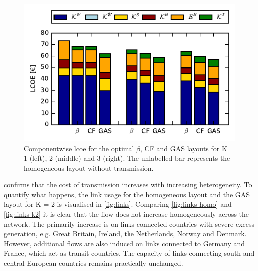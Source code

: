 \documentclass[a4paper, 5p, sort&compress]{elsarticle}%
\begin{document}
\begin{figure}[h!]
  \centering
  \includegraphics[width = \columnwidth]{costVE50}
  \caption{Componentwise \gls{lcoe} for the optimal $\beta$, CF and GAS layouts
    for K = 1 (left), 2 (middle) and 3 (right). The unlabelled bar
    represents the homogeneous layout without transmission.}
  \label{fig:cost}
\end{figure}

 confirms that the cost of transmission increases with increasing
heterogeneity. To quantify what happens, the link usage for the homogeneous layout and the GAS
layout for K = 2 is visualised in \cref{fig:links}. Comparing \cref{fig:links-homo} and
\cref{fig:links-k2} it is clear that the flow does not increase homogeneously across the
network. The primarily increase is on links connected countries with severe excess generation,
e.g. Great Britain, Ireland, the Netherlands, Norway and Denmark. %
However, additional flows are also induced on links connected to Germany and France, which act
as transit countries. The capacity of links connecting south and central European countries
remains practically unchanged.
\end{document}
